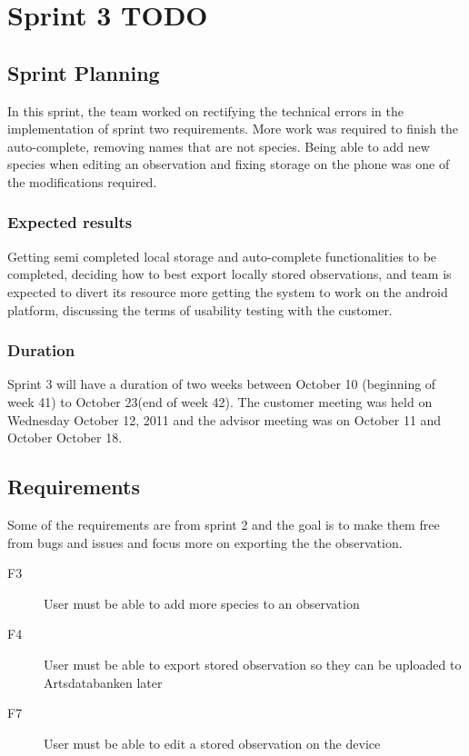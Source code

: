 \section{Sprint 3 TODO}

	\subsection{Sprint Planning}
In this sprint, the team worked on rectifying the technical errors in the implementation of sprint two requirements. More work was required to finish the auto-complete, removing names that are not species. Being able to add new species when editing an observation and fixing storage on the phone was one of the modifications required.
	\subsubsection{Expected results}
Getting semi completed local storage and auto-complete functionalities to be completed, deciding how to best export locally stored observations, and team is expected to divert its resource more getting the system to work on the android platform, discussing the terms of usability testing with the customer.
	\subsubsection{Duration}
Sprint 3 will have a duration of two weeks between October 10 (beginning of week 41) to October 23(end of week 42). The customer meeting was held on Wednesday October 12, 2011 and the advisor meeting was on October 11 and October October 18.
	\subsection{Requirements}
Some of the requirements are from sprint 2 and the goal is to make them free from bugs and issues and focus more on exporting the the observation.
\begin{description}

\item[F3] User must be able to add more species to an observation

\item[F4] User must be able to export stored observation so they can be uploaded to Artsdatabanken later

\item[F7] User must be able to edit a stored observation on the device
\end{description}

